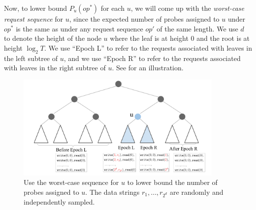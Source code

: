 Now, to lower bound 
$P_{u}(op^*)$ for each $u$, 
we will come up with the {\it worst-case request sequence} for $u$,
since the expected number of probes assigned to $u$ under $op^*$
is the same as 
under any request
sequence $op'$ of the same length.
We use $d$ to denote the height of the node $u$
where the leaf is at height $0$ and 
the root is at height $\log_2 T$. 
We use ``Epoch L'' to refer 
to the requests associated with leaves in the left subtree
of $u$, and we use 
``Epoch R'' to refer to the requests 
associated with leaves in the right subtree of $u$.
See  
for an illustration.

\begin{figure}[t]
\centering
\includegraphics[width=0.9\textwidth]{ln-proof}
\caption{Use the worst-case sequence for $u$ to lower bound
the number of probes assigned to $u$.
The data strings 
$r_1, \ldots, r_{2^d}$ are randomly and independently sampled.
}
\label{fig:lnproof}
\end{figure}



